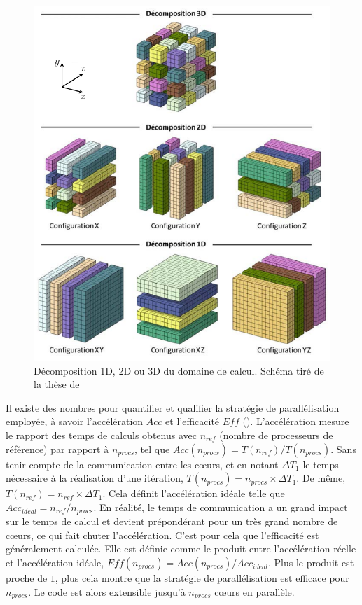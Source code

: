 \begin{figure}[!hbtp]
    \centering
    \includegraphics[width=0.8\linewidth]{Chap2/Pictures/Parallelisation/MULTIFAST_decompositions.pdf}
    \caption{Décomposition 1D, 2D ou 3D du domaine de calcul. Schéma tiré de la thèse de \cite{Bauer_PhDThesis}}
    \label{fig/MULTIFAST_decompositions}
\end{figure}

Il existe des nombres pour quantifier et qualifier la stratégie de parallélisation employée, à savoir l'accélération $Acc$ et l'efficacité $Eff$ (\cite{Tsoutsanis_Lecture}). L'accélération mesure le rapport des temps de calculs obtenus avec $n_{ref}$ (nombre de processeurs de référence) par rapport à $n_{procs}$, tel que $Acc(n_{procs}) = T(n_{ref}) / T(n_{procs})$. Sans tenir compte de la communication entre les cœurs, et en notant $\Delta T_{1}$ le temps nécessaire à la réalisation d'une itération, $T(n_{procs}) = n_{procs} \times \Delta T_{1}$. De même, $T(n_{ref}) = n_{ref} \times \Delta T_{1}$. Cela définit l'accélération idéale telle que $Acc_{id\acute{e}al} = n_{ref}/n_{procs}$. En réalité, le temps de communication a un grand impact sur le temps de calcul et devient prépondérant pour un très grand nombre de cœurs, ce qui fait chuter l'accélération. C'est pour cela que l'efficacité est généralement calculée. Elle est définie comme le produit entre l'accélération réelle et l'accélération idéale, $Eff(n_{procs})=Acc(n_{procs})/Acc_{id\acute{e}al}$. Plus le produit est proche de $1$, plus cela montre que la stratégie de parallélisation est efficace pour $n_{procs}$. Le code est alors extensible jusqu'à $n_{procs}$ cœurs en parallèle.\\

